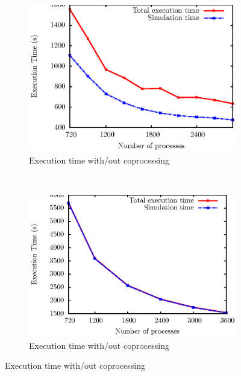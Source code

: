 \begin{figure}
        \begin{subfigure}[b]{0.50\textwidth}
          \includegraphics[scale=0.50]{pictures/test1.ps}
                \caption{Execution time with/out coprocessing}
                \label{fig:copro}
        \end{subfigure}%
        ~
        \begin{subfigure}[b]{0.50\textwidth}
          \includegraphics[scale=0.50]{pictures/test12.ps}
                \caption{Execution time with/out coprocessing}
                \label{fig:204copro}
        \end{subfigure}%


\end{figure}
